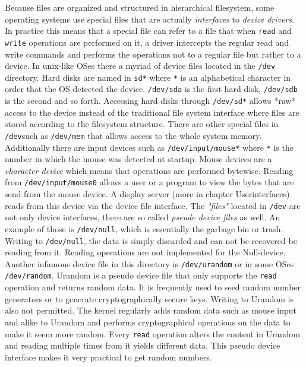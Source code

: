 Because files are organized and structured in hierarchical filesystem, some operating systems use special
files that are actually \textit{interfaces} to \textit{device drivers}. In practice this means that a special file can
refer to a file that when \texttt{read} and \texttt{write} operations are performed on it, a driver intercepts the regular
read and write commands and performs the operations not to a regular file but rather to a device. In unix-like
OSes there a myriad of device files located in the \texttt{/dev} directory. Hard disks are named in \texttt{sd*} where \texttt{*}
is an alphabetical character in order that the OS detected the device. \texttt{/dev/sda} is the first hard disk,
\texttt{/dev/sdb} is the second and so forth. Accessing hard disks through \texttt{/dev/sd*} allows *raw* access to the
device instead of the traditional file system interface where files are stored according to the filesystem
structure. There are other special files in \texttt{/dev}such as \texttt{/dev/mem} that allows access to the whole system
memory. Additionally there are input devices such as \texttt{/dev/input/mouse*} where \texttt{*} is the number in which the
mouse was detected at startup. Mouse devices are a \textit{character device} which means that operations are performed
bytewise. Reading from \texttt{/dev/input/mouse0} allows a user or a program to view the bytes that are send from the
mouse device. A display server (more in chapter Userinterfaces) reads from this device via the device file
interface. The \textit{"files"} located in \texttt{/dev} are not only device interfaces, there are so called \textit{pseude device files}
as well. An example of those is \texttt{/dev/null}, which is essentially the garbage bin or trash. Writing to \texttt{/dev/null},
the data is simply discarded and can not be recovered be reading from it. Reading operations are not implemented for
the Null-device. Another infamous device file in this directory is \texttt{/dev/urandom} or in some OSes \texttt{/dev/random}. Urandom is a pseudo device file
that only supports the \texttt{read} operation and returns random data. It is frequently used to seed random number
generators or to generate cryptographically secure keys. Writing to Urandom is also not permitted. The kernel regularly
adds random data such as mouse input and alike to Urandom and performs cryptographical operations on the data to make
it seem more random. Every \texttt{read} operation alters the content in Urandom and reading multiple times from it yields
different data. This pseudo device interface makes it very practical to get random numbers.
